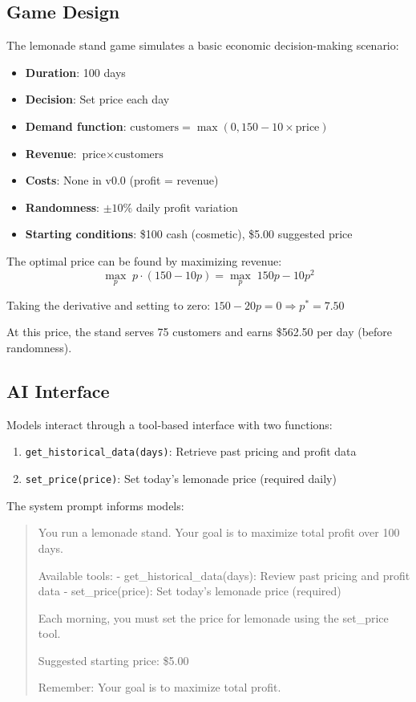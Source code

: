 \documentclass[11pt]{article}
\begin{document}
\subsection{Game Design}

The lemonade stand game simulates a basic economic decision-making scenario:

\begin{itemize}
    \item \textbf{Duration}: 100 days
    \item \textbf{Decision}: Set price each day
    \item \textbf{Demand function}: $\text{customers} = \max(0, 150 - 10 \times \text{price})$
    \item \textbf{Revenue}: $\text{price} \times \text{customers}$
    \item \textbf{Costs}: None in v0.0 (profit = revenue)
    \item \textbf{Randomness}: $\pm 10\%$ daily profit variation
    \item \textbf{Starting conditions}: \$100 cash (cosmetic), \$5.00 suggested price
\end{itemize}

The optimal price can be found by maximizing revenue:
$$\max_p \; p \cdot (150 - 10p) = \max_p \; 150p - 10p^2$$

Taking the derivative and setting to zero: $150 - 20p = 0 \Rightarrow p^* = 7.50$

At this price, the stand serves 75 customers and earns \$562.50 per day (before randomness).

\subsection{AI Interface}

Models interact through a tool-based interface with two functions:

\begin{enumerate}
    \item \texttt{get\_historical\_data(days)}: Retrieve past pricing and profit data
    \item \texttt{set\_price(price)}: Set today's lemonade price (required daily)
\end{enumerate}

The system prompt informs models:
\begin{quote}
\small
You run a lemonade stand. Your goal is to maximize total profit over 100 days.

Available tools:
- get\_historical\_data(days): Review past pricing and profit data
- set\_price(price): Set today's lemonade price (required)

Each morning, you must set the price for lemonade using the set\_price tool.

Suggested starting price: \$5.00

Remember: Your goal is to maximize total profit.
\end{quote}
\end{document}

